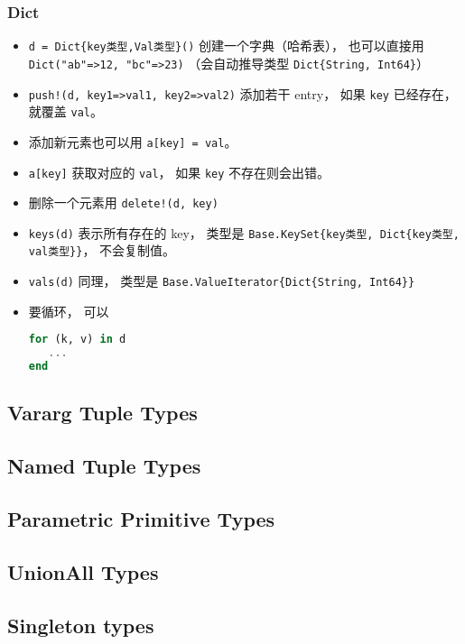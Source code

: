 \subsubsection{Dict}
\begin{itemize}
\item \verb`d = Dict{key类型,Val类型}()` 创建一个字典（哈希表）， 也可以直接用 \verb`Dict("ab"=>12, "bc"=>23)` （会自动推导类型 \verb`Dict{String, Int64}`）
\item \verb`push!(d, key1=>val1, key2=>val2)` 添加若干 entry， 如果 \verb`key` 已经存在， 就覆盖 \verb`val`。
\item 添加新元素也可以用 \verb`a[key] = val`。
\item \verb`a[key]` 获取对应的 \verb`val`， 如果 \verb`key` 不存在则会出错。
\item 删除一个元素用 \verb`delete!(d, key)`
\item \verb`keys(d)` 表示所有存在的 key， 类型是 \verb`Base.KeySet{key类型, Dict{key类型, val类型}}`， 不会复制值。
\item \verb`vals(d)` 同理， 类型是 \verb`Base.ValueIterator{Dict{String, Int64}}`
\item 要循环， 可以
\begin{lstlisting}[language=julia]
for (k, v) in d
   ...
end
\end{lstlisting}
\end{itemize}


\subsection{Vararg Tuple Types}

\subsection{Named Tuple Types}

\subsection{Parametric Primitive Types}

\subsection{UnionAll Types}

\subsection{Singleton types}

